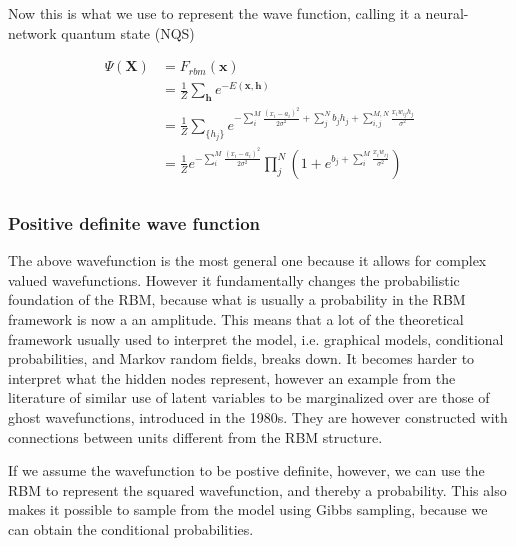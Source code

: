 \documentclass[twoside,english]{uiofysmaster}
\begin{document}
Now this is what we use to represent the wave function, calling it a neural-network quantum state (NQS)

\begin{align}
	\Psi (\mathbf{X}) &= F_{rbm}(\mathbf{x}) \\
	&= \frac{1}{Z}\sum_{\bm{h}} e^{-E(\mathbf{x}, \mathbf{h})} \\
	&= \frac{1}{Z} \sum_{\{h_j\}} e^{-\sum_i^M \frac{(x_i - a_i)^2}{2\sigma^2} + \sum_j^N b_j h_j + \sum_{i,j}^{M,N} \frac{x_i w_{ij} h_j}{\sigma^2}} \\
	&= \frac{1}{Z} e^{-\sum_i^M \frac{(x_i - a_i)^2}{2\sigma^2}} \prod_j^N (1 + e^{b_j + \sum_i^M \frac{x_i w_{ij}}{\sigma^2}}) \\
\end{align}

\subsubsection{Positive definite wave function}
The above wavefunction is the most general one because it allows for complex valued wavefunctions. However it fundamentally changes the probabilistic foundation of the RBM, because what is usually a probability in the RBM framework is now a an amplitude. This means that a lot of the theoretical framework usually used to interpret the model, i.e. graphical models, conditional probabilities, and Markov random fields, breaks down. It becomes harder to interpret what the hidden nodes represent, however an example from the literature of similar use of latent variables to be marginalized over are those of ghost wavefunctions, introduced in the 1980s. They are however constructed with connections between units different from the RBM structure.

If we assume the wavefunction to be postive definite, however, we can use the RBM to represent the squared wavefunction, and thereby a probability. This also makes it possible to sample from the model using Gibbs sampling, because we can obtain the conditional probabilities.
\end{document}

